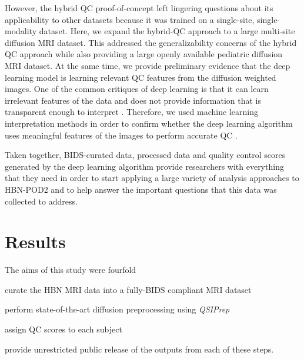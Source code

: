 \documentclass[fleqn,10pt]{wlscirep}
\begin{document}
However, the hybrid QC proof-of-concept left lingering questions about its
applicability to other datasets because it was trained on a single-site,
single-modality dataset.  Here, we expand the hybrid-QC approach to a large
multi-site diffusion MRI dataset. This addressed the generalizability concerns
of the hybrid QC approach while also providing a large openly available
pediatric diffusion MRI dataset.  At the same time, we provide preliminary
evidence that the deep learning model is learning relevant QC features from the
diffusion weighted images.  One of the common critiques of deep learning is that
it can learn irrelevant features of the data and does not provide information
that is transparent enough to interpret \cite{lipton2017doctor,
salahuddin2022transparency}.
Therefore, we used machine learning interpretation methods in order to confirm
whether the deep learning algorithm uses meaningful features of the images to
perform accurate QC \cite{sundararajan2017axiomatic,murdoch2019definitions}.

Taken together, BIDS-curated data, processed data and quality control scores
generated by the deep learning algorithm provide researchers with everything
that they need in order to start applying a large variety of analysis approaches
to HBN-POD2 and to help answer the important questions that this data was
collected to address.


\section*{Results}

The aims of this study were fourfold
\begin{enumerate*}[%
    label=(\roman*),%
    before=\unskip{: },%
    itemjoin={{, }},%
    itemjoin*={{, and }}]
    \item curate the HBN MRI data into a fully-BIDS compliant MRI dataset
    \item perform state-of-the-art diffusion preprocessing using \emph{QSIPrep}
    \item assign QC scores to each subject
    \item provide unrestricted public release of the outputs from each of these
    steps.
\end{enumerate*}
\end{document}

